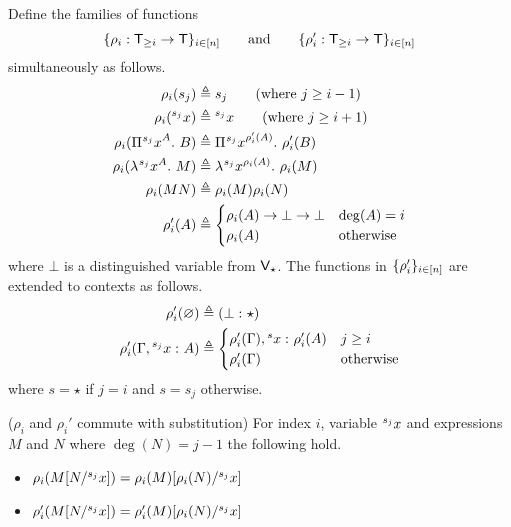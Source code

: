 \documentclass{article}
\begin{document}
\begin{definition}
Define the families of functions
\begin{displaymath}
  \{\rho_i : \mathsf{T}_{\geq i} \to \mathsf{T} \}_{i \in [n]}
  \qquad \text{and} \qquad
  \{\rho_i' : \mathsf{T}_{\geq i} \to \mathsf{T}\}_{i \in [n]}
\end{displaymath}
simultaneously as follows.
\begin{align*}
  \rho_i(s_j) &\triangleq s_j \qquad \text{(where $j \geq i - 1$)} \\
  \rho_i({}^{s_{j}}{x}) &\triangleq {}^{s_{j}}{x} \qquad \text{(where $j \geq i + 1$)} \\
  \rho_i({\Pi^{} {{}^{s_{j}}{x}}^{A}. \ {B}}) &\triangleq
    {\Pi^{} {{}^{s_{j}}{x}}^{\rho_i'(A)}. \ {\rho_i'(B)}} \\
  \rho_i(\lambda^{} {}^{s_{j}}{x}^{A}. \ M) &\triangleq
    \lambda^{} {}^{s_{j}}{x}^{\rho_i(A)}. \ \rho_i(M) \\
  \rho_i(M N) &\triangleq \rho_i(M) \rho_i(N) \\
  \rho_i'(A) &\triangleq
  \begin{cases}
    \rho_i(A) \to \bot \to \bot & \deg(A) = i \\
    \rho_i(A) & \textnormal{otherwise}
  \end{cases}
\end{align*}
where $\bot$ is a distinguished variable from $\mathsf{V}_\star$.
The functions in $\{\rho_i'\}_{i \in [n]}$ are extended to contexts as follows.
\begin{align*}
\rho_i'(\varnothing) &\triangleq ({{\bot} :^{} {\star}}) \\
\rho_i'(\Gamma, {{{}^{s_{j}}{x}} :^{} {A}}) &\triangleq
\begin{cases}
  \rho_i'(\Gamma), {{{}^{s}{x}} :^{} {\rho_i'(A)}} & j \geq i \\
  \rho_i'(\Gamma) & \textnormal{otherwise}
\end{cases}
\end{align*}
where $s = \star$ if $j = i$ and $s = s_j$ otherwise.
\end{definition}

\begin{lemma}
\label{lem:rho-commutes-sub}
($\rho_i$ and $\rho_i'$ commute with substitution) For index $i$, variable ${}^{s_{j}}{x}$ and expressions $M$ and $N$ where $\deg(N) = j - 1$ the following hold.
\begin{itemize}
\item $\rho_i(M[N/{}^{s_{j}}{x}]) = \rho_i(M)[\rho_i(N)/{}^{s_{j}}{x}]$
\item $\rho_i'(M[N/{}^{s_{j}}{x}]) = \rho_i'(M)[\rho_i(N)/{}^{s_{j}}{x}]$
\end{itemize}
\end{lemma}
\end{document}
